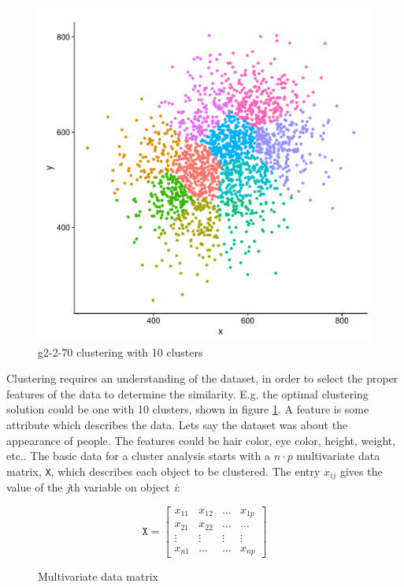 \documentclass[a4paper,10pt]{article}
\theoremstyle{plain}
\theoremstyle{definition}
\begin{document}
\begin{figure}[H]
	\centering
	\includegraphics[scale=0.4]{./pictures/G2/g2-2-70-k10.pdf}
	\caption{g2-2-70 clustering with 10 clusters}
	\label{fig:g2-2-70-k10}
\end{figure}
Clustering requires an understanding of the dataset, in order to select the proper features of the data to determine the similarity. E.g. the optimal clustering solution could be one with 10 clusters, shown in figure \ref{fig:g2-2-70-k10}. A feature is some attribute which describes the data. Lets say the dataset was about the appearance of people. The features could be hair color, eye color, height, weight, etc..
The basic data for a cluster analysis starts with a $n \cdot p$ multivariate data matrix, \texttt{X}, which describes each object to be clustered. The entry $x_{ij}$ gives the value of the \textit{j}th variable on object \textit{i}:
\begin{figure}[H]
	\centering
	\[
	\texttt{X}
	=
	\begin{bmatrix}
	x_{11} & x_{12} & \dots & x_{1p} \\
	x_{21} & x_{22} & \dots & \dots \\
	\vdots & \vdots & \vdots & \vdots \\
	x_{n1} & \dots & \dots & x_{np}
	\end{bmatrix}
	\]
	\caption{Multivariate data matrix}
	\label{fig:dataMatrix}
\end{figure}
\end{document}
